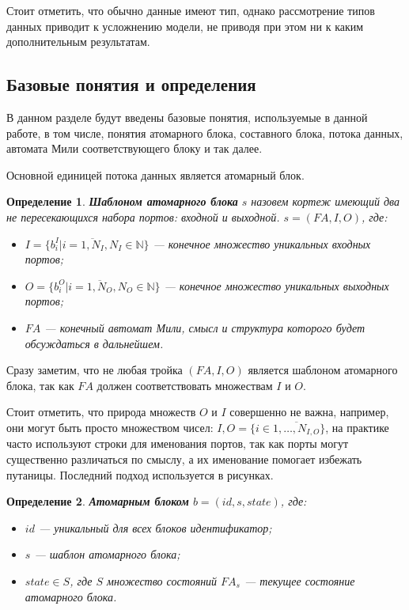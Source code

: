 \documentclass[10pt,a4paper]{article}
\newtheorem{defen}{Определение}
\newcommand{\FA}{F\!A}
\begin{document}
Стоит отметить, что обычно данные имеют тип, однако рассмотрение типов данных приводит к усложнению модели,
не приводя при этом ни к каким дополнительным результатам.

\subsection{Базовые понятия и определения}
В данном разделе будут введены базовые понятия, используемые в данной работе, в том числе,
понятия атомарного блока, составного блока, потока данных, автомата Мили соответствующего блоку и так далее.

Основной единицей потока данных является атомарный блок.
\begin{defen}
  \textbf{Шаблоном атомарного блока} $s$ назовем кортеж имеющий два не пересекающихся набора портов: \textit{входной} и \textit{выходной}.
  $s = (\FA, I, O)$, где:
  \begin{itemize}
    \item $I = \{b^I_i \vert i = \overline{1, N_I}, N_I \in \mathbb{N}\}$ --- конечное множество уникальных входных портов;
    \item $O = \{b^O_i \vert i = \overline{1, N_O}, N_O \in \mathbb{N}\}$ --- конечное множество уникальных выходных портов;
    \item $\FA$ --- конечный автомат Мили, смысл и структура которого будет обсуждаться в дальнейшем.
  \end{itemize}
\end{defen}
Сразу заметим, что не любая тройка $(\FA, I, O)$ является шаблоном атомарного блока, так как $\FA$ должен
соответствовать множествам $I$ и $O$.

Стоит отметить, что природа множеств $O$ и $I$ совершенно не важна, например, они могут быть просто множеством чисел: $I, O = \{i \in \overline{1, \dots, N_{I, O}}\}$,
на практике часто используют строки для именования портов, так как порты могут существенно различаться по смыслу, а их именование помогает избежать путаницы.
Последний подход используется в рисунках.

\begin{defen}
  \textbf{Атомарным блоком} $b = (id, s, state)$, где:
  \begin{itemize}
    \item $id$ --- уникальный для всех блоков идентификатор;
    \item $s$ --- шаблон атомарного блока;
    \item $state \in S$, где $S$ множество состояний $\FA_s$ --- текущее состояние атомарного блока.
  \end{itemize}
\end{defen}
\end{document}
